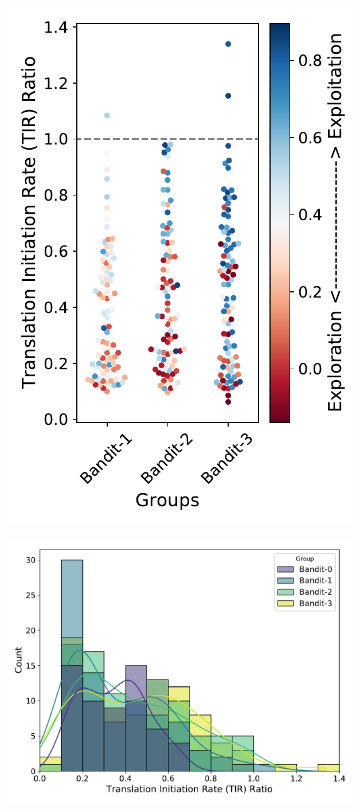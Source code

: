 \documentclass{article}
\begin{document}
\begin{figure}[!ht]
\begin{subfigure}[b]{0.25\textwidth}
        \includegraphics[scale=0.35]{plots/Main_Paper/swarmplot_proj.pdf}
    \end{subfigure}
    \begin{subfigure}[b]{0.48\textwidth}
        \centering
        \caption{}
        \includegraphics[scale=0.4]{plots/Main_Paper/histogram.pdf}

\end{subfigure}
\end{figure}
\end{document}
